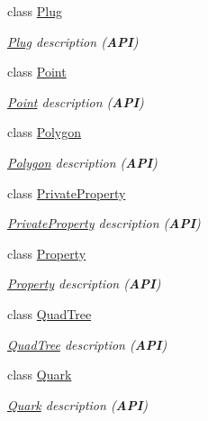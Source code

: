 \begin{DoxyCompactItemize}
class \mbox{\hyperlink{classHurricane_1_1Plug}{Plug}}
\begin{DoxyCompactList}\small\item\em \mbox{\hyperlink{classHurricane_1_1Plug}{Plug}} description ({\bfseries A\+PI}) \end{DoxyCompactList}\item 
class \mbox{\hyperlink{classHurricane_1_1Point}{Point}}
\begin{DoxyCompactList}\small\item\em \mbox{\hyperlink{classHurricane_1_1Point}{Point}} description ({\bfseries A\+PI}) \end{DoxyCompactList}\item 
class \mbox{\hyperlink{classHurricane_1_1Polygon}{Polygon}}
\begin{DoxyCompactList}\small\item\em \mbox{\hyperlink{classHurricane_1_1Polygon}{Polygon}} description ({\bfseries A\+PI}) \end{DoxyCompactList}\item 
class \mbox{\hyperlink{classHurricane_1_1PrivateProperty}{Private\+Property}}
\begin{DoxyCompactList}\small\item\em \mbox{\hyperlink{classHurricane_1_1PrivateProperty}{Private\+Property}} description ({\bfseries A\+PI}) \end{DoxyCompactList}\item 
class \mbox{\hyperlink{classHurricane_1_1Property}{Property}}
\begin{DoxyCompactList}\small\item\em \mbox{\hyperlink{classHurricane_1_1Property}{Property}} description ({\bfseries A\+PI}) \end{DoxyCompactList}\item 
class \mbox{\hyperlink{classHurricane_1_1QuadTree}{Quad\+Tree}}
\begin{DoxyCompactList}\small\item\em \mbox{\hyperlink{classHurricane_1_1QuadTree}{Quad\+Tree}} description ({\bfseries A\+PI}) \end{DoxyCompactList}\item 
class \mbox{\hyperlink{classHurricane_1_1Quark}{Quark}}
\begin{DoxyCompactList}\small\item\em \mbox{\hyperlink{classHurricane_1_1Quark}{Quark}} description ({\bfseries A\+PI}) \end{DoxyCompactList}\item 

\end{DoxyCompactItemize}
